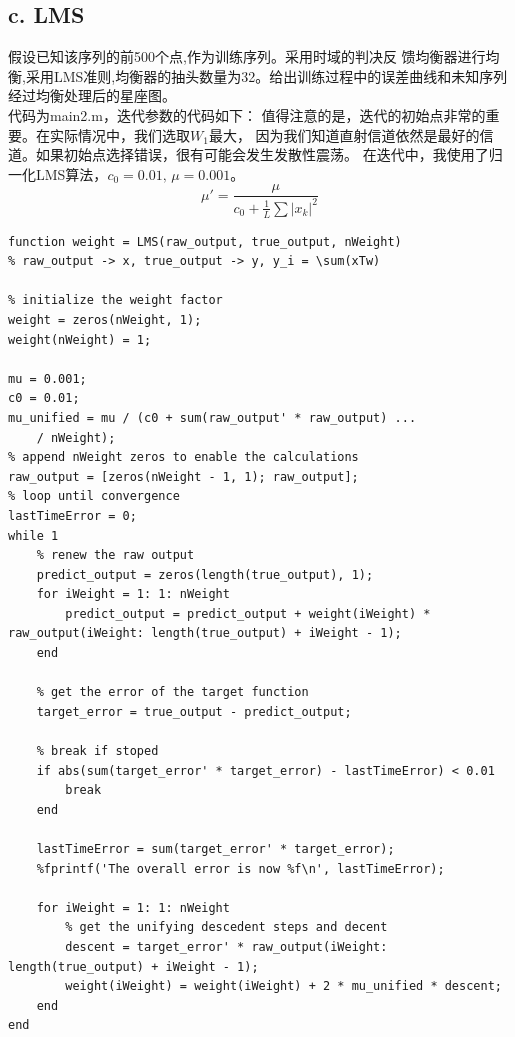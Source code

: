 \documentclass{article}
\begin{document}
\subsection*{c. LMS}假设已知该序列的前500个点,作为训练序列。采用时域的判决反
馈均衡器进行均衡,采用LMS准则,均衡器的抽头数量为32。给出训练过程中的误差曲线和未知序列经过均衡处理后的星座图。\\
代码为main2.m，迭代参数的代码如下：
值得注意的是，迭代的初始点非常的重要。在实际情况中，我们选取\(W_1\)最大，
因为我们知道直射信道依然是最好的信道。如果初始点选择错误，很有可能会发生发散性震荡。
在迭代中，我使用了归一化LMS算法，\(c_0 = 0.01,\,\mu = 0.001\)。
\begin{equation}
\mu' = \frac{\mu}{c_0 + \frac{1}{L}\sum\nolimits|x_k|^2}
\end{equation}
\begin{lstlisting}
function weight = LMS(raw_output, true_output, nWeight)
% raw_output -> x, true_output -> y, y_i = \sum(xTw)

% initialize the weight factor
weight = zeros(nWeight, 1);
weight(nWeight) = 1;

mu = 0.001;
c0 = 0.01;
mu_unified = mu / (c0 + sum(raw_output' * raw_output) ...
    / nWeight);
% append nWeight zeros to enable the calculations
raw_output = [zeros(nWeight - 1, 1); raw_output];
% loop until convergence
lastTimeError = 0;
while 1
    % renew the raw output
    predict_output = zeros(length(true_output), 1);
    for iWeight = 1: 1: nWeight
        predict_output = predict_output + weight(iWeight) * raw_output(iWeight: length(true_output) + iWeight - 1);
    end
    
    % get the error of the target function
    target_error = true_output - predict_output;
    
    % break if stoped
    if abs(sum(target_error' * target_error) - lastTimeError) < 0.01
        break
    end
    
    lastTimeError = sum(target_error' * target_error);
    %fprintf('The overall error is now %f\n', lastTimeError);
    
    for iWeight = 1: 1: nWeight
        % get the unifying descedent steps and decent
        descent = target_error' * raw_output(iWeight: length(true_output) + iWeight - 1);
        weight(iWeight) = weight(iWeight) + 2 * mu_unified * descent;
    end
end
\end{lstlisting}
\end{document}
